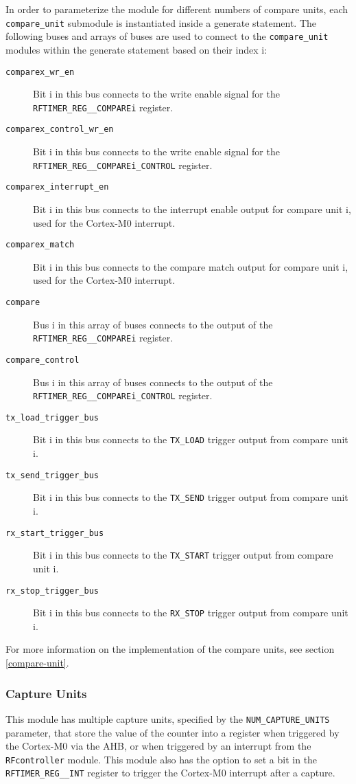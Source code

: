 In order to parameterize the module for different numbers of compare units, each \texttt{compare\_unit} submodule is instantiated inside a generate statement. The following buses and arrays of buses are used to connect to the \texttt{compare\_unit} modules within the generate statement based on their index i:

\begin{description}
	\item[\texttt{comparex\_wr\_en}] Bit i in this bus connects to the write enable signal for the \texttt{RFTIMER\-\_REG\-\_\_COMPAREi} register.
	\item[\texttt{comparex\_control\_wr\_en}] Bit i in this bus connects to the write enable signal for the \texttt{RFTIMER\_REG\_\_COMPAREi\_CONTROL} register.
	\item[\texttt{comparex\_interrupt\_en}] Bit i in this bus connects to the interrupt enable output for compare unit i, used for the Cortex-M0 interrupt.
	\item[\texttt{comparex\_match}] Bit i in this bus connects to the compare match output for compare unit i, used for the Cortex-M0 interrupt.
	\item[\texttt{compare}] Bus i in this array of buses connects to the output of the \texttt{RFTIMER\_REG\-\_\_COMPAREi} register.
	\item[\texttt{compare\_control}] Bus i in this array of buses connects to the output of the \texttt{RFTIMER\-\_REG\-\_\_COMPAREi\_CONTROL} register.
	\item[\texttt{tx\_load\_trigger\_bus}] Bit i in this bus connects to the \texttt{TX\_LOAD} trigger output from compare unit i.
	\item[\texttt{tx\_send\_trigger\_bus}] Bit i in this bus connects to the \texttt{TX\_SEND} trigger output from compare unit i.
	\item[\texttt{rx\_start\_trigger\_bus}] Bit i in this bus connects to the \texttt{TX\_START} trigger output from compare unit i.
	\item[\texttt{rx\_stop\_trigger\_bus}] Bit i in this bus connects to the \texttt{RX\_STOP} trigger output from compare unit i.
\end{description}

For more information on the implementation of the compare units, see section \ref{compare-unit}.

\subsubsection{Capture Units}
This module has multiple capture units, specified by the \texttt{NUM\_CAPTURE\_UNITS} parameter, that store the value of the counter into a register when triggered by the Cortex-M0 via the AHB, or when triggered by an interrupt from the \texttt{RFcontroller} module. This module also has the option to set a bit in the \texttt{RFTIMER\_REG\_\_INT} register to trigger the Cortex-M0 interrupt after a capture.

